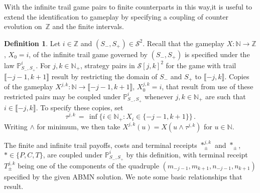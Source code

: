 \documentclass[letterpaper,11pt,oneside,reqno]{amsbook}
\newcommand{\PP}{\ensuremath{\mathbb{P}}}
\newcommand{\N}{\ensuremath{\mathbb{N}}}
\newcommand{\Z}{\ensuremath{\mathbb{Z}}}
\numberwithin{figure}{chapter}
\theoremstyle{definition}
\theoremstyle{definition}
\theoremstyle{definition}
\newtheorem{definition}[theorem]{Definition}
\theoremstyle{definition}
\theoremstyle{definition}
\newcommand{\mc}{\mathcal}
\newcommand{\nwithzero}{\N}
\newcommand{\nwithoutzero}{\N_+}
\newcommand{\game}{{\rm Trail}}
\newcommand{\abmnmacspace}{\textrm{ABMN} }
\begin{document}
With the infinite trail game pairs to finite counterparts in this way,it is useful to extend the identification to gameplay by specifying a coupling of counter evolution on~$\Z$ and the finite intervals. 
  \begin{definition}\label{d.coupling}
  Let $i \in \Z$ and $(S_-,S_+) \in \mc{S}^2$. Recall that the gameplay $X:\N \to \Z$, $X_0 = i$, of the infinite trail game governed by $(S_-,S_+)$ is specified under the law $\PP_{S_-,S_+}^i$.
 For $j,k \in \nwithoutzero$,  strategy pairs in $\mc{S}[j,k]^2$ for the game with trail $\llbracket -j -1,k+1\rrbracket$ result by restricting the domain of $S_-$ and $S_+$ to $\llbracket -j ,k \rrbracket$. 
   Copies of the gameplay $X^{j,k}:\nwithzero \to \llbracket -j-1,k+1 \rrbracket$, $X^{j,k}_0 = i$, 
   that result from use of these restricted pairs may be coupled under  $\PP_{S_-,S_+}^i$  whenever $j,k \in \nwithoutzero$ are such that $i \in \llbracket -j ,k \rrbracket$.
   To specify these copies, set 
\begin{equation}\label{e.taujk}
\tau^{j,k} \, = \, \inf \big\{ i \in \nwithoutzero: X_i \in \{-j-1,k+1 \} \big\} \, .
\end{equation}
Writing $\wedge$ for minimum, 
we then take $X^{j,k}(u) = X(u \wedge \tau^{j,k})$ for $u \in \nwithzero$. 
  \end{definition} 
  The finite and infinite trail payoffs, costs and terminal receipts $*_\pm^{j,k}$ and $*_\pm$, $* \in \{P,C,T\}$, are coupled under  $\PP_{S_-,S_+}^i$ by this definition, with terminal receipt~$T_\pm^{j,k}$ being one of the components of the quadruple $(m_{-j-1},m_{k+1},n_{-j-1},n_{k+1})$  specified by the given \abmnmacspace solution. We note some basic relationships that result. 
\end{document}
